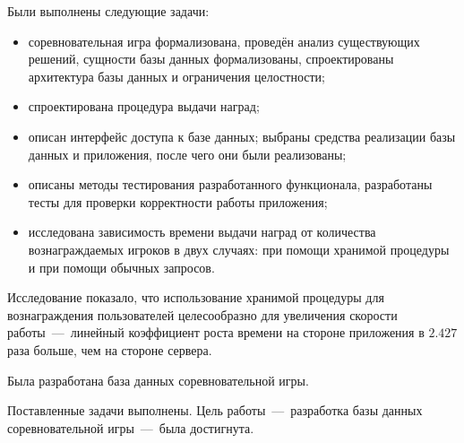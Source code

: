
Были выполнены следующие задачи:
\begin{itemize}
	\item соревновательная игра формализована, проведён анализ существующих решений,
	сущности базы данных формализованы, спроектированы архитектура базы данных и ограничения целостности;
	\item спроектирована процедура выдачи наград;
	\item описан интерфейс доступа к базе данных; выбраны средства реализации базы данных и приложения, после чего они были реализованы;
	\item описаны методы тестирования разработанного функционала, разработаны тесты для проверки корректности работы приложения;
	\item исследована зависимость времени выдачи наград от количества вознаграждаемых игроков в двух случаях: при помощи хранимой процедуры и при помощи обычных запросов.
\end{itemize}

Исследование показало, что использование хранимой процедуры для вознаграждения пользователей целесообразно для увеличения скорости работы~---~линейный коэффициент роста времени на стороне приложения в $2.427$ раза больше, чем на стороне сервера.

Была разработана база данных соревновательной игры.

Поставленные задачи выполнены. Цель работы~---~разработка базы данных соревновательной игры~---~была достигнута.